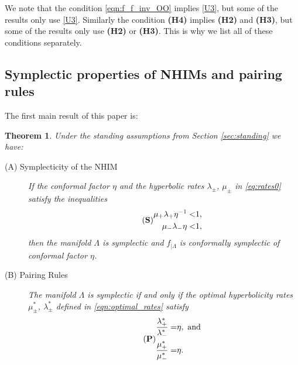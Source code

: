 \documentclass[11pt]{amsart}
\newtheorem{thm}{Theorem}[section]
\theoremstyle{definition}
\theoremstyle{remark}
\numberwithin{equation}{section}
\begin{document}
We note that the condition \eqref{eqn:f_f_inv_OO} implies \eqref{U3}, but some of the results only use \eqref{U3}.
Similarly the condition \textbf{(H4)} implies \textbf{(H2)} and \textbf{(H3)}, but some of the results only use \textbf{(H2)} or \textbf{(H3)}.
This is why we list all of these conditions separately.


\subsection{Symplectic properties of NHIMs and pairing rules}
\label{geomNHIM}


The first main result of this paper is:

\begin{thm}\label{thm:main1}
Under  the standing assumptions from Section \ref{sec:standing} we have:

\begin{description}
\item[(A) Symplecticity of the NHIM]
If the conformal factor $\eta$ and the hyperbolic rates  $\lambda_\pm$, $\mu_\pm$  in \eqref{eq:rates0} satisfy the inequalities
\begin{equation}\label{eqn:conformal_rates}\tag{{\bf S}}
\begin{split}
\mu_+ \lambda_+ \eta^{-1}<&1,\\
\mu_- \lambda_-\eta<&1,\\
\end{split}
\end{equation}
then the manifold $\Lambda$  is symplectic and $f_{\mid\Lambda}$ is conformally symplectic of conformal factor $\eta$.

\item[(B) Pairing Rules]
The manifold $\Lambda$ is symplectic if and only if the optimal hyperbolicity rates $\mu_\pm ^*$, $\lambda_\pm ^*$ defined in \eqref{eqn:optimal_rates}
satisfy
\begin{equation}
\label{eqn:pairing_rules}\tag{{\bf P}}
\begin{split}
\frac{\lambda_+^*}{\lambda_-^*}=&\eta, \textrm { and} \\
\frac{\mu_+^*}{\mu_-^*}=&\eta.
\end{split}
\end{equation}
\end{description}
\end{thm}
\end{document}
